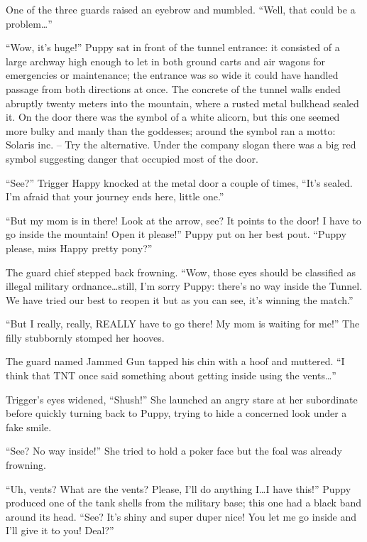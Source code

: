 One of the three guards raised an eyebrow and mumbled. ``Well, that could be a problem\dots''

\horizonline


``Wow, it's huge!'' Puppy sat in front of the tunnel entrance: it consisted of a large archway high enough to let in both ground carts and air wagons for emergencies or maintenance; the entrance was so wide it could have handled passage from both directions at once. The concrete of the tunnel walls ended abruptly twenty meters into the mountain, where a rusted metal bulkhead sealed it. On the door there was the symbol of a white alicorn, but this one seemed more bulky and manly than the goddesses; around the symbol ran a motto: Solaris inc. -- Try the alternative. Under the company slogan there was a big red symbol suggesting danger that occupied most of the door.

``See?'' Trigger Happy knocked at the metal door a couple of times, ``It's sealed. I'm afraid that your journey ends here, little one.''

``But my mom is in there! Look at the arrow, see? It points to the door! I have to go inside the mountain! Open it please!'' Puppy put on her best pout. ``Puppy please, miss Happy pretty pony?''

The guard chief stepped back frowning. ``Wow, those eyes should be classified as illegal military ordnance\dots still, I'm sorry Puppy: there's no way inside the Tunnel. We have tried our best to reopen it but as you can see, it's winning the match.''

``But I really, really, REALLY have to go there! My mom is waiting for me!'' The filly stubbornly stomped her hooves.

The guard named Jammed Gun tapped his chin with a hoof and muttered. ``I think that TNT once said something about getting inside using the vents\dots''

Trigger's eyes widened, ``Shush!'' She launched an angry stare at her subordinate before quickly turning back to Puppy, trying to hide a concerned look under a fake smile.

``See? No way inside!'' She tried to hold a poker face but the foal was already frowning.

``Uh, vents? What are the vents? Please, I'll do anything I\dots I have this!'' Puppy produced one of the tank shells from the military base; this one had a black band around its head. ``See? It's shiny and super duper nice! You let me go inside and I'll give it to you! Deal?''

